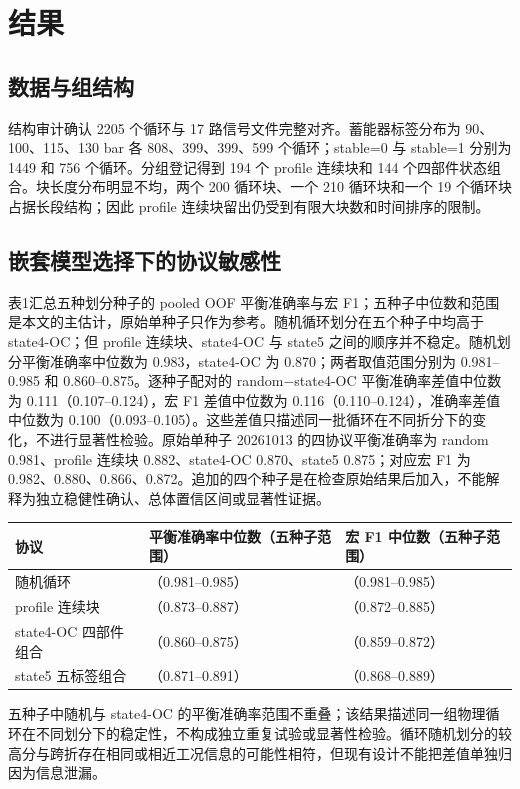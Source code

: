 \documentclass[UTF8,12pt,a4paper]{ctexart}
\newcommand{\toprule}{\hline}
\newcommand{\midrule}{\hline}
\newcommand{\bottomrule}{\hline}
\begin{document}
\section{结果}
\subsection{数据与组结构}
结构审计确认 2205 个循环与 17 路信号文件完整对齐。蓄能器标签分布为 90、100、115、130 bar 各 808、399、399、599 个循环；stable=0 与 stable=1 分别为 1449 和 756 个循环。分组登记得到 194 个 profile 连续块和 144 个四部件状态组合。块长度分布明显不均，两个 200 循环块、一个 210 循环块和一个 19 个循环块占据长段结构；因此 profile 连续块留出仍受到有限大块数和时间排序的限制。

\subsection{嵌套模型选择下的协议敏感性}
表1汇总五种划分种子的 pooled OOF 平衡准确率与宏 F1；五种子中位数和范围是本文的主估计，原始单种子只作为参考。随机循环划分在五个种子中均高于 state4-OC；但 profile 连续块、state4-OC 与 state5 之间的顺序并不稳定。随机划分平衡准确率中位数为 0.983，state4-OC 为 0.870；两者取值范围分别为 0.981–0.985 和 0.860–0.875。逐种子配对的 random−state4-OC 平衡准确率差值中位数为 0.111（0.107–0.124），宏 F1 差值中位数为 0.116（0.110–0.124），准确率差值中位数为 0.100（0.093–0.105）。这些差值只描述同一批循环在不同折分下的变化，不进行显著性检验。原始单种子 20261013 的四协议平衡准确率为 random 0.981、profile 连续块 0.882、state4-OC 0.870、state5 0.875；对应宏 F1 为 0.982、0.880、0.866、0.872。追加的四个种子是在检查原始结果后加入，不能解释为独立稳健性确认、总体置信区间或显著性证据。

\begin{table}[H]
\centering
\small
\begin{tabularx}{\linewidth}{>{\raggedright\arraybackslash}X >{\raggedright\arraybackslash}X >{\raggedright\arraybackslash}X}
\toprule
协议 & 平衡准确率中位数（五种子范围） & 宏 F1 中位数（五种子范围） \\
\midrule
随机循环 & 0.983（0.981–0.985） & 0.982（0.981–0.985） \\
profile 连续块 & 0.880（0.873–0.887） & 0.878（0.872–0.885） \\
state4-OC 四部件组合 & 0.870（0.860–0.875） & 0.866（0.859–0.872） \\
state5 五标签组合 & 0.876（0.871–0.891） & 0.872（0.868–0.889） \\
\bottomrule
\end{tabularx}
\end{table}
五种子中随机与 state4-OC 的平衡准确率范围不重叠；该结果描述同一组物理循环在不同划分下的稳定性，不构成独立重复试验或显著性检验。循环随机划分的较高分与跨折存在相同或相近工况信息的可能性相符，但现有设计不能把差值单独归因为信息泄漏。
\end{document}
